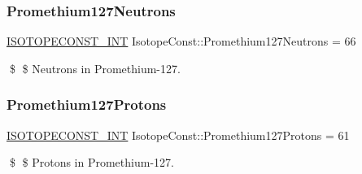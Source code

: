 \subsubsection{\texorpdfstring{Promethium127\+Neutrons}{Promethium127Neutrons}}
{\footnotesize\ttfamily \mbox{\hyperlink{group___isotope_const-_macros_ga5f18360b3e99483a35c32d789e62621c}{I\+S\+O\+T\+O\+P\+E\+C\+O\+N\+S\+T\+\_\+\+I\+NT}} Isotope\+Const\+::\+Promethium127\+Neutrons = 66}

\$ \$ Neutrons in Promethium-\/127. \mbox{\label{group___isotope_const-_promethium-_pm127_ga15eee155c59fa482ba6535af63d4ed89}} 
\subsubsection{\texorpdfstring{Promethium127\+Protons}{Promethium127Protons}}
{\footnotesize\ttfamily \mbox{\hyperlink{group___isotope_const-_macros_ga5f18360b3e99483a35c32d789e62621c}{I\+S\+O\+T\+O\+P\+E\+C\+O\+N\+S\+T\+\_\+\+I\+NT}} Isotope\+Const\+::\+Promethium127\+Protons = 61}

\$ \$ Protons in Promethium-\/127. 
